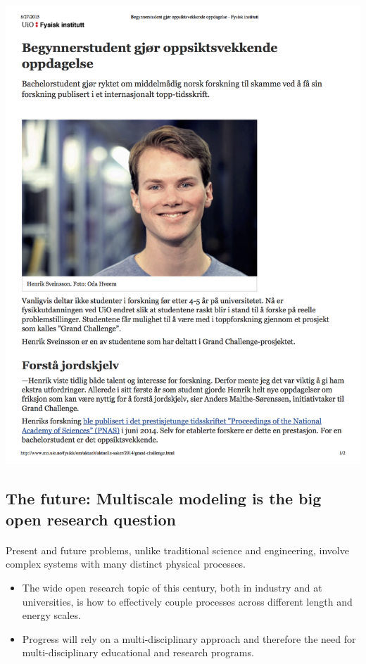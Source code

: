 \documentclass[%
twoside,                 %
final,                   %
10pt]{article}
\begin{document}
\centerline{\includegraphics[width=0.7\linewidth]{fig-future/pnas.png}}






\subsection*{The future: Multiscale modeling is the big open research question}


\paragraph{}
Present and future problems, unlike traditional
science and engineering, involve complex systems with many distinct
physical processes. 
\begin{itemize}
\item The wide open research topic of this century, both in industry and at universities, is how to effectively couple processes across different length and energy scales. 

\item Progress will rely on a multi-disciplinary approach and therefore the  need for multi-disciplinary educational and research programs.
\end{itemize}

\noindent
\end{document}
